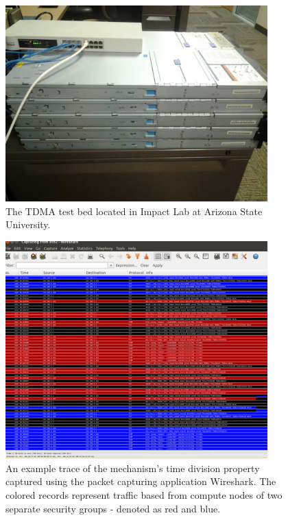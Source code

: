 \documentclass[oneside,12pt]{memoir}
\begin{document}
\begin{figure}
  \begin{center}
    \includegraphics[width=0.9\textwidth]{test_bed.jpg}
  \end{center}
  \caption{The TDMA test bed located in Impact Lab at Arizona State University.}
\label{fig:test_bed}
\end{figure}
    
    
\begin{figure}
  \begin{center}
    \includegraphics[width=0.9\textwidth]{wireshark.jpg}
  \end{center}
  \caption{An example trace of the mechanism's time division property captured using the packet capturing application Wireshark. The colored records represent traffic based from compute nodes of two separate security groups - denoted as red and blue.}
\label{fig:wireshark}
\end{figure}
\end{document}
